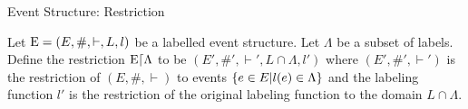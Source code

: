 \begin{frame}{Event Structure: Restriction}
    \begin{definition}
        Let $\mathrm{E} = (E,\#,\vdash,L,l)$ be a labelled event structure.
        Let $\Lambda$ be a subset of labels.
        Define the restriction $\mathrm{E}\lceil \Lambda$ to be $(E',\#',\vdash',L\cap \Lambda,l')$
        where $(E',\#',\vdash')$ is the restriction of $(E,\#,\vdash)$
        to events $\{e \in E|l(e) \in \Lambda\}$ and the labeling function $l'$
        is the restriction of the original labeling function to the domain $L \cap \Lambda$.
    \end{definition}
\end{frame}